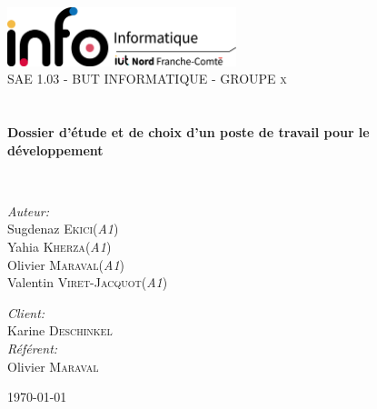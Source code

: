 \begin{titlepage}
\begin{center}

\includegraphics[width=0.5\textwidth]{./images/InfoLogoQuadriH.png}~\\[1cm]

\textsc{\LARGE SAE 1.03 - BUT INFORMATIQUE - GROUPE x}\\[1.5cm]

\textsc{\Large }\\[0.5cm]

\HRule \\[0.4cm]

{\huge \bfseries Dossier d'étude et de choix d'un poste de travail pour le développement\\[0.4cm] }

\HRule \\[1.5cm]

\begin{minipage}{0.4\textwidth}
\begin{flushleft} \large
\emph{Auteur:}\\
Sugdenaz \textsc{Ekici}(\textit{A1})\\
Yahia \textsc{Kherza}(\textit{A1})\\
Olivier \textsc{Maraval}(\textit{A1})\\
Valentin \textsc{Viret-Jacquot}(\textit{A1})
\end{flushleft}
\end{minipage}
\begin{minipage}{0.4\textwidth}
\begin{flushright} \large
\emph{Client:} \\
Karine \textsc{Deschinkel}\\
\emph{Référent:} \\
Olivier \textsc{Maraval}
\end{flushright}
\end{minipage}

\vfill

{\large \today}

\end{center}
\end{titlepage}
